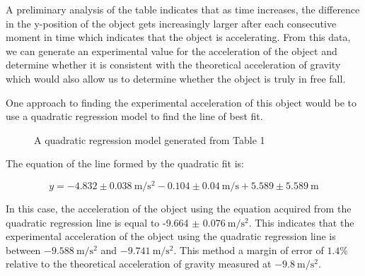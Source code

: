 \documentclass[12pt]{article}
\begin{document}
A preliminary analysis of the table indicates that as time increases, the difference in the y-position of the object gets increasingly larger after each consecutive moment in time which indicates that the object is accelerating. From this data, we can generate an experimental value for the acceleration of the object and determine whether it is consistent with the theoretical acceleration of gravity which would also allow us to determine whether the object is truly in free fall.

One approach to finding the experimental acceleration of this object would be to use a quadratic regression model to find the line of best fit.

\begin{figure}[H]
    \centering

    \caption[10pt]{A quadratic regression model generated from Table 1}


\end{figure}
The equation of the line formed by the quadratic fit is:

\[ y=-4.832 \pm \SI{0.038}{\metre\per\second\squared}-0.104 \pm \SI{0.04}{\metre\per\second}+5.589 \pm \SI{5.589}{\metre}\]

In this case, the acceleration of the object using the equation acquired from the quadratic regression line is equal to -9.664 $\pm$ $\SI{0.076}{\metre\per\second\squared}$. This indicates that the experimental acceleration of the object using the quadratic regression line is between $\SI{-9.588}{\metre\per\second\squared}$ and $\SI{-9.741}{\metre\per\second\squared}$. This method a margin of error of $1.4\%$ relative to the theoretical acceleration of gravity measured at $\SI{-9.8}{\metre\per\second\squared}$.
\end{document}
